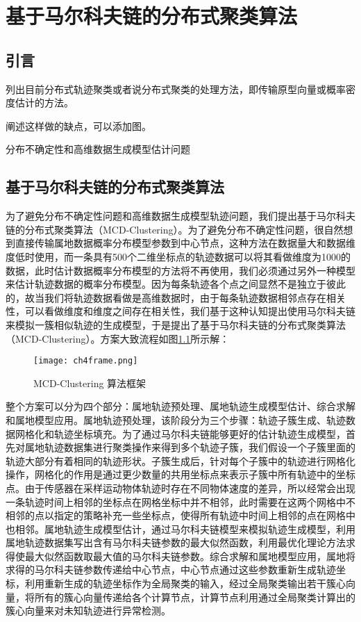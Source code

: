 \chapter{基于马尔科夫链的分布式聚类算法}

\section{引言}
列出目前分布式轨迹聚类或者说分布式聚类的处理方法，即传输原型向量或概率密度估计的方法。

阐述这样做的缺点，可以添加图。

分布不确定性和高维数据生成模型估计问题

\section{基于马尔科夫链的分布式聚类算法}

为了避免分布不确定性问题和高维数据生成模型轨迹问题，我们提出基于马尔科夫链的分布式聚类算法（MCD-Clustering）。为了避免分布不确定性问题，很自然想到直接传输属地数据概率分布模型参数到中心节点，这种方法在数据量大和数据维度低时使用，而一条具有500个二维坐标点的轨迹数据可以将其看做维度为1000的数据，此时估计数据概率分布模型的方法将不再使用，我们必须通过另外一种模型来估计轨迹数据的概率分布模型。因为每条轨迹各个点之间显然不是独立于彼此的，故当我们将轨迹数据看做是高维数据时，由于每条轨迹数据相邻点存在相关性，可以看做维度和维度之间存在相关性，我们基于这种认知提出使用马尔科夫链来模拟一簇相似轨迹的生成模型，于是提出了基于马尔科夫链的分布式聚类算法（MCD-Clustering）。方案大致流程如图\ref{ch4frame}所示解：
\begin{figure}[h]
	\texttt{[image: ch4frame.png]}
	\caption{MCD-Clustering 算法框架}
	\label{ch4frame}
\end{figure}

整个方案可以分为四个部分：属地轨迹预处理、属地轨迹生成模型估计、综合求解和属地模型应用。属地轨迹预处理，该阶段分为三个步骤：轨迹子簇生成、轨迹数据网格化和轨迹坐标填充。为了通过马尔科夫链能够更好的估计轨迹生成模型，首先对属地轨迹数据集进行聚类操作来得到多个轨迹子簇，我们假设一个子簇里面的轨迹大部分有着相同的轨迹形状。子簇生成后，针对每个子簇中的轨迹进行网格化操作，网格化的作用是通过更少数量的共用坐标点来表示子簇中所有轨迹中的坐标点。由于传感器在采样运动物体轨迹时存在不同物体速度的差异，所以经常会出现一条轨迹时间上相邻的坐标点在网格坐标中并不相邻，此时需要在这两个网格中不相邻的点以指定的策略补充一些坐标点，使得所有轨迹中时间上相邻的点在网格中也相邻。属地轨迹生成模型估计，通过马尔科夫链模型来模拟轨迹生成模型，利用属地轨迹数据集写出含有马尔科夫链参数的最大似然函数，利用最优化理论方法求得使最大似然函数取最大值的马尔科夫链参数。综合求解和属地模型应用，属地将求得的马尔科夫链参数传递给中心节点，中心节点通过这些参数重新生成轨迹坐标，利用重新生成的轨迹坐标作为全局聚类的输入，经过全局聚类输出若干簇心向量，将所有的簇心向量传递给各个计算节点，计算节点利用通过全局聚类计算出的簇心向量来对未知轨迹进行异常检测。

